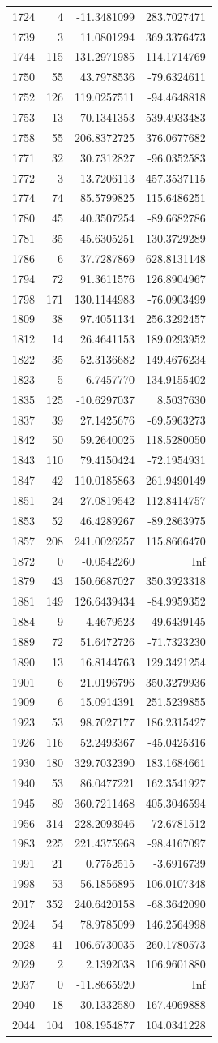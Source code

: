 \documentclass[
]{article}
\begin{document}
\begin{longtable}[]{@{}lrrr@{}}
1724 & 4 & -11.3481099 & 283.7027471\tabularnewline
1739 & 3 & 11.0801294 & 369.3376473\tabularnewline
1744 & 115 & 131.2971985 & 114.1714769\tabularnewline
1750 & 55 & 43.7978536 & -79.6324611\tabularnewline
1752 & 126 & 119.0257511 & -94.4648818\tabularnewline
1753 & 13 & 70.1341353 & 539.4933483\tabularnewline
1758 & 55 & 206.8372725 & 376.0677682\tabularnewline
1771 & 32 & 30.7312827 & -96.0352583\tabularnewline
1772 & 3 & 13.7206113 & 457.3537115\tabularnewline
1774 & 74 & 85.5799825 & 115.6486251\tabularnewline
1780 & 45 & 40.3507254 & -89.6682786\tabularnewline
1781 & 35 & 45.6305251 & 130.3729289\tabularnewline
1786 & 6 & 37.7287869 & 628.8131148\tabularnewline
1794 & 72 & 91.3611576 & 126.8904967\tabularnewline
1798 & 171 & 130.1144983 & -76.0903499\tabularnewline
1809 & 38 & 97.4051134 & 256.3292457\tabularnewline
1812 & 14 & 26.4641153 & 189.0293952\tabularnewline
1822 & 35 & 52.3136682 & 149.4676234\tabularnewline
1823 & 5 & 6.7457770 & 134.9155402\tabularnewline
1835 & 125 & -10.6297037 & 8.5037630\tabularnewline
1837 & 39 & 27.1425676 & -69.5963273\tabularnewline
1842 & 50 & 59.2640025 & 118.5280050\tabularnewline
1843 & 110 & 79.4150424 & -72.1954931\tabularnewline
1847 & 42 & 110.0185863 & 261.9490149\tabularnewline
1851 & 24 & 27.0819542 & 112.8414757\tabularnewline
1853 & 52 & 46.4289267 & -89.2863975\tabularnewline
1857 & 208 & 241.0026257 & 115.8666470\tabularnewline
1872 & 0 & -0.0542260 & Inf\tabularnewline
1879 & 43 & 150.6687027 & 350.3923318\tabularnewline
1881 & 149 & 126.6439434 & -84.9959352\tabularnewline
1884 & 9 & 4.4679523 & -49.6439145\tabularnewline
1889 & 72 & 51.6472726 & -71.7323230\tabularnewline
1890 & 13 & 16.8144763 & 129.3421254\tabularnewline
1901 & 6 & 21.0196796 & 350.3279936\tabularnewline
1909 & 6 & 15.0914391 & 251.5239855\tabularnewline
1923 & 53 & 98.7027177 & 186.2315427\tabularnewline
1926 & 116 & 52.2493367 & -45.0425316\tabularnewline
1930 & 180 & 329.7032390 & 183.1684661\tabularnewline
1940 & 53 & 86.0477221 & 162.3541927\tabularnewline
1945 & 89 & 360.7211468 & 405.3046594\tabularnewline
1956 & 314 & 228.2093946 & -72.6781512\tabularnewline
1983 & 225 & 221.4375968 & -98.4167097\tabularnewline
1991 & 21 & 0.7752515 & -3.6916739\tabularnewline
1998 & 53 & 56.1856895 & 106.0107348\tabularnewline
2017 & 352 & 240.6420158 & -68.3642090\tabularnewline
2024 & 54 & 78.9785099 & 146.2564998\tabularnewline
2028 & 41 & 106.6730035 & 260.1780573\tabularnewline
2029 & 2 & 2.1392038 & 106.9601880\tabularnewline
2037 & 0 & -11.8665920 & Inf\tabularnewline
2040 & 18 & 30.1332580 & 167.4069888\tabularnewline
2044 & 104 & 108.1954877 & 104.0341228\tabularnewline

\end{longtable}
\end{document}
